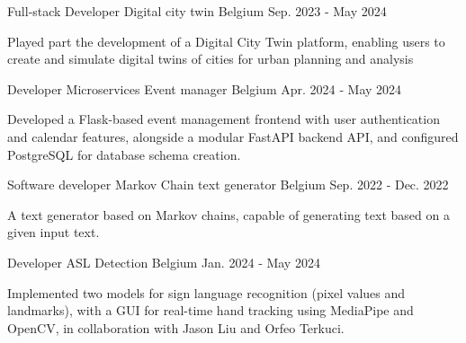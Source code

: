 \begin{cventries}

  \cventry
    {Full‑stack Developer} %
    {Digital city twin} %
    {Belgium} %
    {Sep. 2023 ‑ May 2024} %
    {
      \begin{cvitems} %
        \item {Played part the development of a Digital City Twin platform, enabling users to create and simulate digital twins of cities for urban planning and analysis}
      \end{cvitems}
    }


  \cventry
  {Developer} %
  {Microservices Event manager} %
  {Belgium} %
  {Apr. 2024 ‑ May 2024} %
  {
    \begin{cvitems} %
      \item {Developed a Flask-based event management frontend with user authentication and calendar features, alongside a modular FastAPI backend API, and configured PostgreSQL for database schema creation.}
    \end{cvitems}
  }


  \cventry
    {Software developer} %
    {Markov Chain text generator} %
    {Belgium} %
    {Sep. 2022 ‑ Dec. 2022} %
    {
      \begin{cvitems} %
        \item {A text generator based on Markov chains, capable of generating text based on a given input text.}
      \end{cvitems}
    }


  \cventry
    {Developer} %
    {ASL Detection} %
    {Belgium} %
    {Jan. 2024 ‑ May 2024} %
    {
      \begin{cvitems} %
        \item {Implemented two models for sign language recognition (pixel values and landmarks), with a GUI for real-time hand tracking using MediaPipe and OpenCV, in collaboration with Jason Liu and Orfeo Terkuci.}
      \end{cvitems}
    }



\end{cventries}
